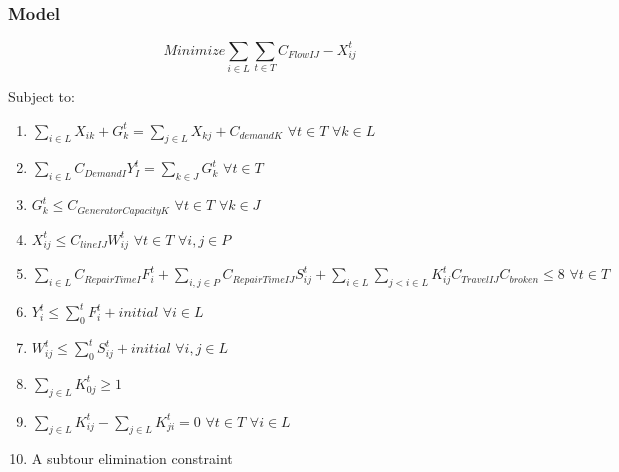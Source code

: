 \documentclass{article}
\begin{document}
	\subsubsection{Model}
	$$	Minimize \sum_{i \in L} \sum_{t \in T} C_{FlowIJ}-X_{ij}^t $$
	
	Subject to:
	\begin{enumerate}[label=(\arabic*), leftmargin=*, itemsep=0.4ex, before={\everymath{\displaystyle}}]%
		
		\item $\sum_{i \in L} X_{ik}+G_{k}^{t} = \sum_{j \in L} X_{kj}+C_{demandK} \hspace{4pt} \forall t \in T \hspace{4pt} \forall k \in L$ 
		\item $\sum_{i \in L} C_{DemandI}Y_I^t = \sum_{k \in J} G_k^t \hspace{4pt} \forall t \in T$
		\item $G_k^t \leq C_{GeneratorCapacityK} \hspace{4pt} \forall t\in T \hspace{4pt} \forall k \in J$
		\item $X_{ij}^t \leq C_{lineIJ}W_{ij}^t \hspace{4pt} \forall t \in T \hspace{4pt} \forall i,j \in P$
		\item $\sum_{i \in L} C_{RepairTimeI} F_{i}^t +\sum_{i,j \in P} C_{RepairTimeIJ} S_{ij}^t + \sum_{i \in L} \sum_{j<i \in L}  K_{ij}^t C_{TravelIJ} C_{broken} \leq 8 \hspace{4pt} \forall t \in T \hspace{4pt}$
		\item $Y_i^t \leq \sum_{0}^{t} F_i^t+initial \hspace{4pt} \forall i \in L$ 
		\item $W_{ij}^t \leq \sum_{0}^{t} S_{ij}^t+initial \hspace{4pt} \forall i,j \in L $
		\item $\sum_{j \in L} K_{0j}^t \geq 1 $
		\item $\sum_{j \in L}K_{ij}^t - \sum_{j \in L}K_{ji}^t = 0  \hspace{4pt} \forall t \in T \hspace{4pt} \forall i \in L$
		\item A subtour elimination constraint 
	\end{enumerate}
\end{document}
